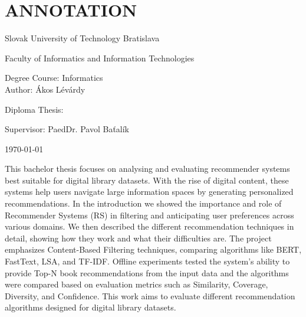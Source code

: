 \documentclass[\myFontSize,a4paper,oneside,english,hidelinks]{article}
\begin{document}
\titleformat{\section}{\LARGE\bfseries}{\thesection}{1em}{}
\titleformat{\subsection}{\Large\bfseries}{\thesubsection}{1em}{}
\titleformat{\subsubsection}{\Large\bfseries}{\thesubsubsection}{1em}{}

%
%

\newpage{}
\thispagestyle{empty}
\mbox{}

\newpage{} 
\thispagestyle{empty}
\section*{ANNOTATION}
\begin{minipage}[t]{1\columnwidth}%
Slovak University of Technology Bratislava 

Faculty of Informatics and Information Technologies

Degree Course: Informatics\\

Author: Ákos Lévárdy

Diploma Thesis: \thesisTitle

Supervisor: PaedDr. Pavol Baťalík

\today%
\end{minipage}
\bigskip{}

This bachelor thesis focuses on analysing and evaluating recommender systems best suitable for digital library datasets. With the rise of digital content, these systems help users navigate large information spaces by generating personalized recommendations. In the introduction we showed the importance and role of Recommender Systems (RS) in filtering and anticipating user preferences across various domains. We then described the different recommendation techniques in detail, showing how they work and what their difficulties are. The project emphasizes Content-Based Filtering techniques, comparing algorithms like BERT, FastText, LSA, and TF-IDF. Offline experiments tested the system’s ability to provide Top-N book recommendations from the input data and the algorithms were compared based on evaluation metrics such as Similarity, Coverage, Diversity, and Confidence. This work aims to evaluate different recommendation algorithms designed for digital library datasets.
\end{document}
